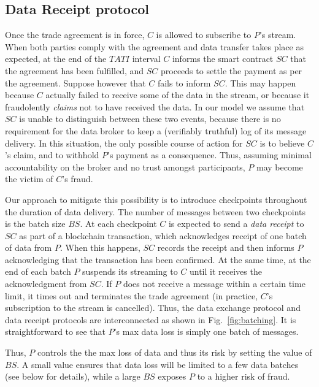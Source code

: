 \documentclass[letterpaper, 10 pt, conference]{ieeeconf}  %
\newcommand{\bs}{\ensuremath{\mathit{BS}}}
\newcommand{\tati}{\ensuremath{\mathit{TATI}}}
\newcommand{\smartc}{\ensuremath{\mathit{SC}}}
\begin{document}
\subsection{Data Receipt protocol}  \label{sec:protocol}

Once the trade agreement is in force,  $C$ is allowed to subscribe to $P$'s stream.
When both parties comply with the agreement and data transfer takes place as expected, at the end of the \tati{} interval $C$ informs the smart contract \smartc{} that the agreement has been fulfilled, and \smartc{} proceeds to settle the payment as per the agreement.
Suppose however that $C$ fails to inform \smartc. This may happen because $C$ actually failed to receive some of the data in the stream, or because it fraudolently \textit{claims} not to have received the data.
In our model we assume that \smartc{} is unable to distinguish between these two events, because there is no requirement for the data broker to keep a (verifiably truthful) log of its message delivery.
In this situation, the only possible course of action for \smartc{} is to believe $C$'s claim, and to withhold $P$'s payment as a consequence.
Thus, assuming minimal accountability on the broker and no trust amongst participants, $P$ may become the victim of $C$'s fraud.

Our approach to mitigate this possibility is to introduce checkpoints throughout the duration of data delivery. 
The number of messages between two checkpoints is the batch size \bs. 
At each checkpoint $C$ is expected to send a \textit{data receipt} to \smartc{} as part of a blockchain transaction, which acknowledges receipt of one batch of data from $P$.
When this happens, \smartc{} records the receipt and then informs $P$ acknowledging that the transaction has been confirmed.
At the same time, at the end of each batch $P$ suspends its streaming to $C$ until it receives the acknowledgment from \smartc.
If $P$ does not receive a message within a certain time limit, it times out and terminates the trade agreement (in practice, $C$'s subscription to the stream is cancelled).
Thus, the data exchange protocol and data receipt protocols are interconnected as shown in Fig.~\ref{fig:batching}.
It is straightforward to see that $P$'s max data loss is simply one batch  of messages.

Thus,  $P$ controls the the max loss of data and thus its risk by setting the value of \bs.
A small value ensures that data loss will be limited to a few data batches (see below for details), while a large \bs{} exposes $P$ to a higher risk of fraud.
\end{document}
